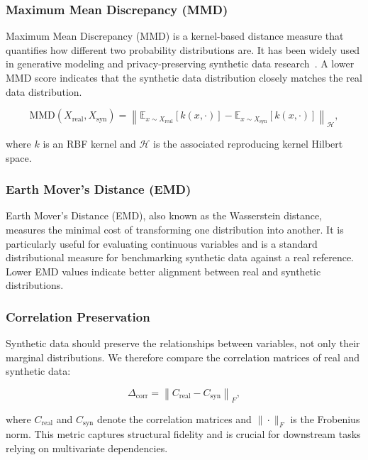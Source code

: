 \documentclass[11pt]{article}
\begin{document}
\subsubsection{Maximum Mean Discrepancy (MMD)}

Maximum Mean Discrepancy (MMD) is a kernel-based distance measure that quantifies how different two probability distributions are. It has been widely used in generative modeling and privacy-preserving synthetic data research~\cite{jordon2018pategan}. A lower MMD score indicates that the synthetic data distribution closely matches the real data distribution.

\begin{equation}
\text{MMD}(X_{\text{real}}, X_{\text{syn}}) = 
\left\| 
\mathbb{E}_{x \sim X_{\text{real}}}[k(x, \cdot)] -
\mathbb{E}_{x \sim X_{\text{syn}}}[k(x, \cdot)]
\right\|_{\mathcal{H}},
\end{equation}

where $k$ is an RBF kernel and $\mathcal{H}$ is the associated reproducing kernel Hilbert space.

\subsubsection{Earth Mover's Distance (EMD)}

Earth Mover's Distance (EMD), also known as the Wasserstein distance, measures the minimal cost of transforming one distribution into another. It is particularly useful for evaluating continuous variables and is a standard distributional measure for benchmarking synthetic data against a real reference. Lower EMD values indicate better alignment between real and synthetic distributions.

\subsubsection{Correlation Preservation}

Synthetic data should preserve the relationships between variables, not only their marginal distributions. We therefore compare the correlation matrices of real and synthetic data:

\begin{equation}
\Delta_{\text{corr}} = 
\left\| 
C_{\text{real}} - C_{\text{syn}}
\right\|_{F},
\end{equation}

where $C_{\text{real}}$ and $C_{\text{syn}}$ denote the correlation matrices and $\|\cdot\|_{F}$ is the Frobenius norm. This metric captures structural fidelity and is crucial for downstream tasks relying on multivariate dependencies.
\end{document}
